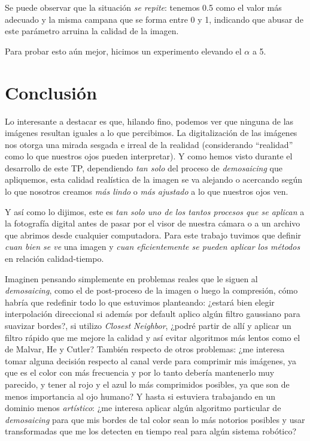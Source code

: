Se puede observar que la situación \textit{se repite}: tenemos 0.5 como el valor más adecuado y la misma campana que se forma entre 0 y 1, indicando que abusar de este parámetro arruina la calidad de la imagen.

\vspace{\baselineskip}
Para probar esto aún mejor, hicimos un experimento elevando el $\alpha$ a 5.


\newpage

\section{Conclusión}

Lo interesante a destacar es que, hilando fino, podemos ver que ninguna de las imágenes resultan iguales a lo que percibimos. La digitalización de las imágenes nos otorga una mirada sesgada e irreal de la realidad (considerando ``realidad'' como lo que nuestros ojos pueden interpretar). Y como hemos visto durante el desarrollo de este TP, dependiendo \textit{tan solo} del proceso de \textit{demosaicing} que apliquemos, esta calidad realística de la imagen se va alejando o acercando según lo que nosotros creamos \textit{más lindo} o \textit{más ajustado} a lo que nuestros ojos ven.

Y así como lo dijimos, este es \textit{tan solo uno de los tantos procesos que se aplican} a la fotografía digital antes de pasar por el visor de nuestra cámara o a un archivo que abrimos desde cualquier computadora. Para este trabajo tuvimos que definir \textit{cuan bien se ve} una imagen y \textit{cuan eficientemente se pueden aplicar los métodos} en relación calidad-tiempo. 

Imaginen pensando simplemente en problemas reales que le siguen al \textit{demosaicing}, como el de post-proceso de la imagen o luego la compresión, cómo habría que redefinir todo lo que estuvimos planteando: ¿estará bien elegir interpolación direccional si además por default aplico algún filtro gaussiano para suavizar bordes?, si utilizo \textit{Closest Neighbor}, ¿podré partir de allí y aplicar un filtro rápido que me mejore la calidad y así evitar algoritmos más lentos como el de Malvar, He y Cutler? También respecto de otros problemas: ¿me interesa tomar alguna decisión respecto al canal verde para comprimir mis imágenes, ya que es el color con más frecuencia y por lo tanto debería mantenerlo muy parecido, y tener al rojo y el azul lo más comprimidos posibles, ya que son de menos importancia al ojo humano? Y hasta si estuviera trabajando en un dominio menos \textit{artístico}: ¿me interesa aplicar algún algoritmo particular de \textit{demosaicing} para que mis bordes de tal color sean lo más notorios posibles y usar transformadas que me los detecten en tiempo real para algún sistema robótico?

